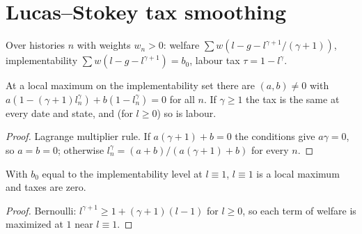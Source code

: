 \section{Lucas--Stokey tax smoothing}

\begin{definition}
\label{def:ls}
\leanok
Over histories $n$ with weights $w_n>0$: welfare $\sum w(l-g-l^{\gamma+1}/(\gamma+1))$, implementability
$\sum w(l-g-l^{\gamma+1})=b_0$, labour tax $\tau=1-l^\gamma$.
\end{definition}

\begin{theorem}
\label{thm:ls}
\leanok
{}
At a local maximum on the implementability set there are $(a,b)\ne0$ with
$a(1-(\gamma+1)l_n^\gamma)+b(1-l_n^\gamma)=0$ for all $n$. If $\gamma\ge1$ the tax is the same at every date and
state, and (for $l\ge0$) so is labour.
\end{theorem}
\begin{proof}
\leanok
Lagrange multiplier rule. If $a(\gamma+1)+b=0$ the conditions give $a\gamma=0$, so $a=b=0$; otherwise
$l_n^\gamma=(a+b)/(a(\gamma+1)+b)$ for every $n$.
\end{proof}

\begin{theorem}
\label{thm:ls_fb}
\leanok
{}
With $b_0$ equal to the implementability level at $l\equiv1$, $l\equiv1$ is a local maximum and taxes are zero.
\end{theorem}
\begin{proof}
\leanok
Bernoulli: $l^{\gamma+1}\ge1+(\gamma+1)(l-1)$ for $l\ge0$, so each term of welfare is maximized at $1$ near $l\equiv1$.
\end{proof}
